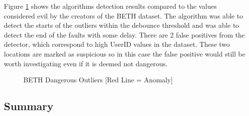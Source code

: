 Figure \ref{fig:beth_evil_outliers} shows the algorithms detection results compared to the values considered evil by the creators of the BETH dataset. The algorithm was able to detect the starts of the outliers within the debounce threshold and was able to detect the end of the faults with some delay. There are 2 false positives from the detector, which correspond to high UserID values in the dataset. These two locations are marked as suspicious so in this case the false positive would still be worth investigating even if it is deemed not dangerous.
 
\begin{figure}[H]
    
    \caption{BETH Dangerous Outliers [Red Line = Anomaly]}
    \label{fig:beth_evil_outliers}
\end{figure}

\subsection{Summary}
